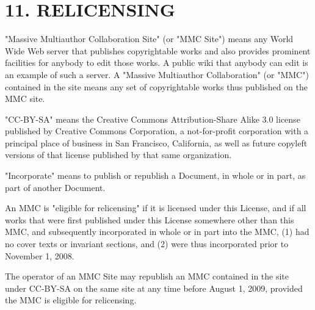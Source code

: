 \section{11. RELICENSING}
"Massive Multiauthor Collaboration Site" (or "MMC Site") means any World Wide Web server that publishes copyrightable works and also provides prominent facilities for anybody to edit those works. A public wiki that anybody can edit is an example of such a server. A "Massive Multiauthor Collaboration" (or "MMC") contained in the site means any set of copyrightable works thus published on the MMC site.\par
"CC-BY-SA" means the Creative Commons Attribution-Share Alike 3.0 license published by Creative Commons Corporation, a not-for-profit corporation with a principal place of business in San Francisco, California, as well as future copyleft versions of that license published by that same organization.\par
"Incorporate" means to publish or republish a Document, in whole or in part, as part of another Document.\par
An MMC is "eligible for relicensing" if it is licensed under this License, and if all works that were first published under this License somewhere other than this MMC, and subsequently incorporated in whole or in part into the MMC, (1) had no cover texts or invariant sections, and (2) were thus incorporated prior to November 1, 2008.\par
The operator of an MMC Site may republish an MMC contained in the site under CC-BY-SA on the same site at any time before August 1, 2009, provided the MMC is eligible for relicensing.\par
